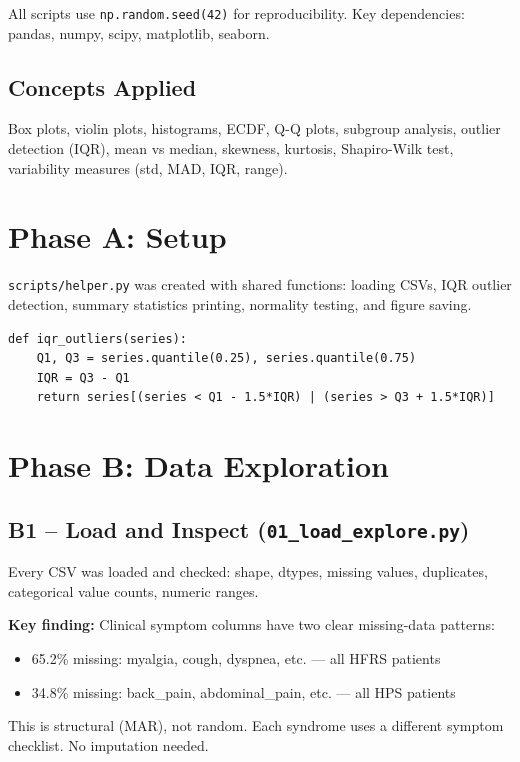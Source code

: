\documentclass[11pt,a4paper]{article}
\begin{document}
All scripts use \texttt{np.random.seed(42)} for reproducibility.
Key dependencies: pandas, numpy, scipy, matplotlib, seaborn.

\subsection{Concepts Applied}
Box plots, violin plots, histograms, ECDF, Q-Q plots, subgroup analysis,
outlier detection (IQR), mean vs median, skewness, kurtosis, Shapiro-Wilk test,
variability measures (std, MAD, IQR, range).

\newpage

\section{Phase A: Setup}

\texttt{scripts/helper.py} was created with shared functions: loading CSVs, IQR outlier
detection, summary statistics printing, normality testing, and figure saving.

\begin{verbatim}
def iqr_outliers(series):
    Q1, Q3 = series.quantile(0.25), series.quantile(0.75)
    IQR = Q3 - Q1
    return series[(series < Q1 - 1.5*IQR) | (series > Q3 + 1.5*IQR)]
\end{verbatim}

\section{Phase B: Data Exploration}

\subsection{B1 -- Load and Inspect (\texttt{01\_load\_explore.py})}

Every CSV was loaded and checked: shape, dtypes, missing values, duplicates,
categorical value counts, numeric ranges.

\textbf{Key finding:} Clinical symptom columns have two clear missing-data patterns:
\begin{itemize}
\item 65.2\% missing: myalgia, cough, dyspnea, etc. --- all HFRS patients
\item 34.8\% missing: back\_pain, abdominal\_pain, etc. --- all HPS patients
\end{itemize}
This is structural (MAR), not random. Each syndrome uses a different symptom checklist.
No imputation needed.
\end{document}
